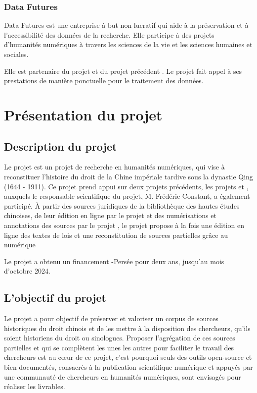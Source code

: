 \subsubsection{Data Futures}
Data Futures est une entreprise à but non-lucratif qui aide à la préservation et à l'accessibilité des données de la recherche. Elle participe à des projets d'humanités numériques à travers les sciences de la vie et les sciences humaines et sociales.

Elle est partenaire du projet \COREL et du projet précédent \EPJ. Le projet fait appel à ses prestations de manière ponctuelle pour le traitement des données.

 \section{Présentation du projet \COREL}
    \subsection{Description du projet}
Le projet \COREL est un projet de recherche en humanités numériques, qui vise à reconstituer l'histoire du droit de la Chine impériale tardive sous la dynastie Qing (1644 - 1911). Ce projet prend appui sur deux projets précédents, les projets \LSC et \EPJ, auxquels le responsable scientifique du projet, M. Frédéric Constant, a également participé. À partir des sources juridiques de la bibliothèque des hautes études chinoises, de leur édition en ligne par le projet \LSC et des numérisations et annotations des sources par le projet \EPJ, le projet \COREL propose à la fois une édition en ligne des textes de lois et une reconstitution de sources partielles grâce au numérique

Le projet a obtenu un financement \CollEx-Persée pour deux ans, jusqu'au mois d'octobre 2024. 

\subsection{L’objectif du projet}
Le projet \COREL a pour objectif de préserver et valoriser un corpus de sources historiques du droit chinois et de les mettre à la disposition des chercheurs, qu'ils soient historiens du droit ou sinologues. Proposer l'agrégation de ces sources partielles et qui se complètent les unes les autres pour faciliter le travail des chercheurs est au c\oe ur de ce projet, c'est pourquoi seuls des outils open-source et bien documentés, consacrés à la publication scientifique numérique et appuyés par une communauté de chercheurs en humanités numériques, sont envisagés pour réaliser les livrables.

